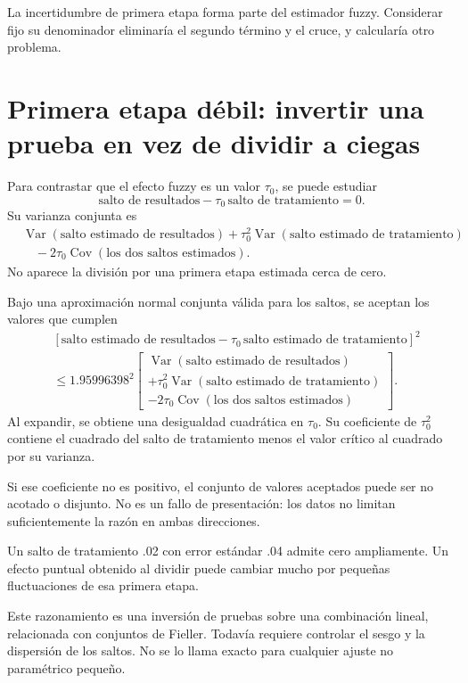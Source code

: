 \documentclass[11pt,a4paper]{article}
\DeclareMathOperator{\Var}{Var}
\DeclareMathOperator{\Cov}{Cov}
\begin{document}
La incertidumbre de primera etapa
forma parte del estimador fuzzy.
Considerar fijo su denominador
eliminaría el segundo término y el cruce,
y calcularía otro problema.

\clearpage
\section{Primera etapa débil: invertir una prueba en vez de dividir a ciegas}\label{unidad46}
Para contrastar que el efecto fuzzy
es un valor \(\tau_0\), se puede estudiar
\[
\text{salto de resultados}
-\tau_0\,\text{salto de tratamiento}=0.
\]
Su varianza conjunta es
\[
\begin{aligned}
&\Var(\text{salto estimado de resultados})
+\tau_0^2\Var(\text{salto estimado de tratamiento})\\
&\quad-2\tau_0\Cov(\text{los dos saltos estimados}).
\end{aligned}
\]
No aparece la división por una
primera etapa estimada cerca de cero.

Bajo una aproximación normal conjunta válida
para los saltos, se aceptan los valores que cumplen
\[
\begin{aligned}
&[\text{salto estimado de resultados}
-\tau_0\,\text{salto estimado de tratamiento}]^2\\
&\le1.95996398^2\left[
\begin{gathered}
\Var(\text{salto estimado de resultados})
\\
+\tau_0^2\Var(\text{salto estimado de tratamiento})
\\
-2\tau_0\Cov(\text{los dos saltos estimados})
\end{gathered}
\right].
\end{aligned}
\]
Al expandir, se obtiene una desigualdad
cuadrática en \(\tau_0\).
Su coeficiente de \(\tau_0^2\) contiene
el cuadrado del salto de tratamiento
menos el valor crítico al cuadrado
por su varianza.

Si ese coeficiente no es positivo,
el conjunto de valores aceptados
puede ser no acotado o disjunto.
No es un fallo de presentación:
los datos no limitan suficientemente
la razón en ambas direcciones.

\begin{ejemplo}
Un salto de tratamiento .02 con error
estándar .04 admite cero ampliamente.
Un efecto puntual obtenido al dividir
puede cambiar mucho por pequeñas
fluctuaciones de esa primera etapa.
\end{ejemplo}
Este razonamiento es una inversión
de pruebas sobre una combinación lineal,
relacionada con conjuntos de Fieller.
Todavía requiere controlar el sesgo
y la dispersión de los saltos.
No se lo llama exacto para
cualquier ajuste no paramétrico pequeño.
\end{document}
